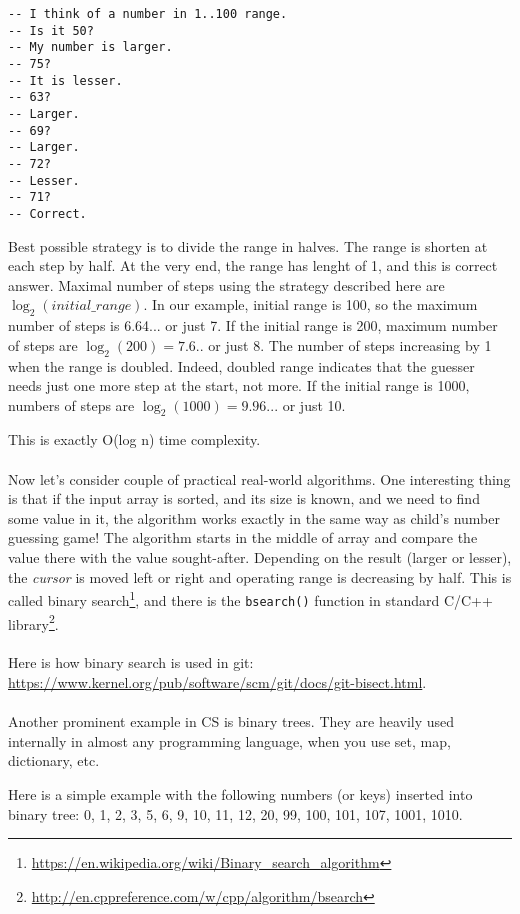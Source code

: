 \begin{lstlisting}
-- I think of a number in 1..100 range.
-- Is it 50?
-- My number is larger.
-- 75?
-- It is lesser.
-- 63?
-- Larger.
-- 69?
-- Larger.
-- 72?
-- Lesser.
-- 71?
-- Correct.
\end{lstlisting}

Best possible strategy is to divide the range in halves.
The range is shorten at each step by half.
At the very end, the range has lenght of 1, and this is correct answer.
Maximal number of steps using the strategy described here are $\log_2(initial\_range)$.
In our example, initial range is 100, so the maximum number of steps is 6.64... or just 7.
If the initial range is 200, maximum number of steps are $\log_2(200)=7.6..$ or just 8. The number of steps increasing by 1 when the range is doubled.
Indeed, doubled range indicates that the guesser needs just one more step at the start, not more.
If the initial range is 1000, numbers of steps are $\log_2(1000)=9.96...$ or just 10.

This is exactly O(log n) time complexity.\\
\\
Now let's consider couple of practical real-world algorithms.
One interesting thing is that if the input array is sorted, and its size is known, and we need to find some value in it, the algorithm works exactly
in the same way as child's number guessing game!
The algorithm starts in the middle of array and compare the value there with the value sought-after.
Depending on the result (larger or lesser), the \textit{cursor} is moved left or right and operating range is decreasing by half.
This is called binary search\footnote{\url{https://en.wikipedia.org/wiki/Binary_search_algorithm}}, and there is the \texttt{bsearch()} function in 
standard C/C++ library\footnote{\url{http://en.cppreference.com/w/cpp/algorithm/bsearch}}.\\
\\
Here is how binary search is used in git: \url{https://www.kernel.org/pub/software/scm/git/docs/git-bisect.html}.\\
\\
Another prominent example in CS is binary trees. They are heavily used internally in almost any programming language, when you use set, map, dictionary, etc.

Here is a simple example with the following numbers (or keys) inserted into binary tree:
0, 1, 2, 3, 5, 6, 9, 10, 11, 12, 20, 99, 100, 101, 107, 1001, 1010.



